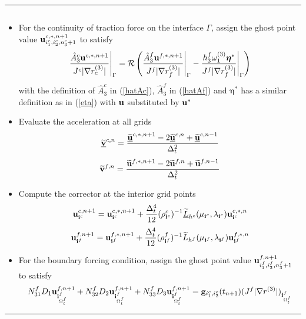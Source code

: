 \documentclass[a4paper]{article}
\makeatletter
\newenvironment{breakablealgorithm}
{%
	\begin{center}
		\refstepcounter{algorithm}%
		\hrule height.8pt depth0pt \kern2pt%
		\renewcommand{\caption}[2][\relax]{%
			{\raggedright\textbf{\ALG@name~\thealgorithm} ##2\par}%
			\ifx\relax##1\relax %
			\addcontentsline{loa}{algorithm}{\protect\numberline{\thealgorithm}##2}%
			\else %
			\addcontentsline{loa}{algorithm}{\protect\numberline{\thealgorithm}##1}%
			\fi
			\kern2pt\hrule\kern2pt
		}
	}{%
		\kern2pt\hrule\relax%
	\end{center}
}
\newcommand{\wt}{\widetilde}
\makeatother
\begin{document}
\begin{breakablealgorithm}
\begin{itemize}
{\begin{equation*}
  	\end{equation*}
  }
  \item{For the continuity of traction force on the interface $\Gamma$, assign the ghost point value ${\bf u}^{c,*,n+1}_{i_1^c,i_2^c,n_3^c+1}$ to satisfy
  	\begin{equation}\label{traction_gamma_pre}
  	\frac{\hat{A}_3^c{\bf u}^{c,*,n+1}}{J^c|\nabla r_c^{(3)}|}\Bigg|_{\Gamma} = \mathcal{R}\left(\frac{\hat{A}_3^f{\bf u}^{f,*,n+1}}{J^f|\nabla r_f^{(3)}|}\Bigg|_{\Gamma} - \frac{h_3^f\omega_1^{(3)}{\bm \eta}^*}{J^f|\nabla r_f^{(3)}|}\Bigg|_{\Gamma}\right)
  	\end{equation}
  	with the definition of $\hat{A}^c_3$ in (\ref{hatAc}), $\hat{A}^f_3$ in (\ref{hatAf}) and ${\bm \eta}^*$ has a similar definition as in (\ref{eta}) with ${\bf u}$ substituted by ${\bf u}^*$
  }
  \item{Evaluate the acceleration at all grids 
  	\begin{equation*}
  	\uline{\wt{\bf v}}^{c,n} = \frac{\uline{\wt{\bf u}}^{c,*,n+1}-2\uline{\wt{\bf u}}^{c,n}+\uline{\wt{\bf u}}^{c,n-1}}{\Delta^2_t}
  	\end{equation*}
  	\begin{equation*}
  	\wt{\bf v}^{f,n} = \frac{\wt{\bf u}^{f,*,n+1}-2\wt{\bf u}^{f,n}+\wt{\bf u}^{f,n-1}}{\Delta^2_t}
  	\end{equation*}
  }
  \item{Compute the corrector at the interior grid points
  	\begin{equation*}
  	{\bf u}^{c,n+1}_{{\bf i}^c} = {\bf u}^{c,*,n+1}_{{\bf i}^c} + \frac{\Delta_t^4}{12}(\rho^c_{{\bf i}^c})^{-1}\uline{\wt{L}}_{h^c}(\mu_{{\bf i}^c},\lambda_{{\bf i}^c}) {\bf{u}}^{c,*,n}_{{\bf i}^c}
  	\end{equation*}
  	\begin{equation*}
  		{\bf u}^{f,n+1}_{{\bf i}^f} = {\bf u}^{f,*,n+1}_{{\bf i}^f} + \frac{\Delta_t^4}{12}(\rho^f_{{\bf i}^f})^{-1}\wt{L}_{h^f}(\mu_{{\bf i}^f},\lambda_{{\bf i}^f}) {\bf{u}}^{f,*,n}_{{\bf i}^f}
  	\end{equation*}
  }
 \item {For the boundary forcing condition, assign the ghost point value ${\bf u}^{f,n+1}_{i^f_1,i^f_2,n_3^f+1}$ to satisfy
 		\begin{equation*}
 	N_{31}^fD_1{\bf u}^{f,n+1}_{{\bf i}^f_{\Omega^f_t}} + N_{32}^fD_2{\bf u}^{f,n+1}_{{\bf i}^f_{\Omega^f_t}} + N_{33}^fD_3{\bf u}^{f,n+1}_{{\bf i}^f_{\Omega^f_t}} = {\bf g}_{i^c_1,i^c_2}(t_{n+1})(J^f|\nabla r^{(3)}|)_{{\bf i}^f_{\Omega^f_t}}

\end{equation*}}
\end{itemize}
\end{breakablealgorithm}
\end{document}
